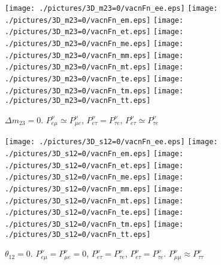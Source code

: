 \begin{figure}[!ht]
\vspace*{-0.75cm}
\texttt{[image: ./pictures/3D\_m23=0/vacnFn\_ee.eps]}\hspace*{-2mm}
\texttt{[image: ./pictures/3D\_m23=0/vacnFn\_em.eps]}\hspace*{-2mm}
\texttt{[image: ./pictures/3D\_m23=0/vacnFn\_et.eps]}\hspace*{-2mm}
\texttt{[image: ./pictures/3D\_m23=0/vacnFn\_me.eps]}\hspace*{-2mm}
\texttt{[image: ./pictures/3D\_m23=0/vacnFn\_mm.eps]}\hspace*{-2mm}
\texttt{[image: ./pictures/3D\_m23=0/vacnFn\_mt.eps]}\hspace*{-2mm}
\texttt{[image: ./pictures/3D\_m23=0/vacnFn\_te.eps]}\hspace*{-2mm}
\texttt{[image: ./pictures/3D\_m23=0/vacnFn\_tm.eps]}\hspace*{-2mm}
\texttt{[image: ./pictures/3D\_m23=0/vacnFn\_tt.eps]}
\caption{$\Delta{m_{23}}=0$. $P^{\nu}_{e\mu}\simeq{}P^{\nu}_{\mu{}e}$, $P^{\nu}_{e\tau}=P^{\nu}_{\tau{}e}$, $P^{\nu}_{e\tau}\simeq{}P^{\nu}_{\tau{}e}$}
\label{vacn3DFn_m23=0}
\end{figure}
\begin{figure}[!ht]
\vspace*{-0.75cm}
\texttt{[image: ./pictures/3D\_s12=0/vacnFn\_ee.eps]}\hspace*{-2mm}
\texttt{[image: ./pictures/3D\_s12=0/vacnFn\_em.eps]}\hspace*{-2mm}
\texttt{[image: ./pictures/3D\_s12=0/vacnFn\_et.eps]}\hspace*{-2mm}
\texttt{[image: ./pictures/3D\_s12=0/vacnFn\_me.eps]}\hspace*{-2mm}
\texttt{[image: ./pictures/3D\_s12=0/vacnFn\_mm.eps]}\hspace*{-2mm}
\texttt{[image: ./pictures/3D\_s12=0/vacnFn\_mt.eps]}\hspace*{-2mm}
\texttt{[image: ./pictures/3D\_s12=0/vacnFn\_te.eps]}\hspace*{-2mm}
\texttt{[image: ./pictures/3D\_s12=0/vacnFn\_tm.eps]}\hspace*{-2mm}
\texttt{[image: ./pictures/3D\_s12=0/vacnFn\_tt.eps]}
\caption{$\theta_{12}=0$. $P^{\nu}_{e\mu}=P^{\nu}_{\mu{}e}=0$, $P^{\nu}_{e\tau}=P^{\nu}_{\tau{}e}$, $P^{\nu}_{e\tau}=P^{\nu}_{\tau{}e}$. $P^{\nu}_{\mu\mu}\approx{}P^{\nu}_{\tau\tau}$}
\label{vacn3DFn_s12=0}
\end{figure}
